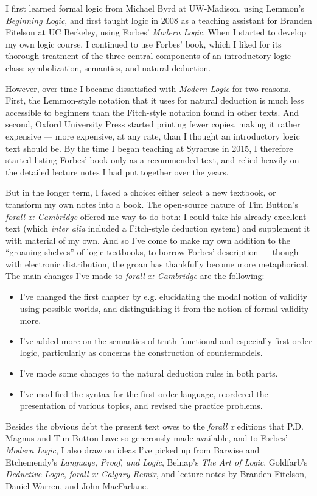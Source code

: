I first learned formal logic from Michael Byrd at UW-Madison, using Lemmon's  \emph{Beginning Logic}, and first taught logic in 2008 as a teaching assistant for Branden Fitelson at UC Berkeley, using Forbes' \emph{Modern Logic}.  When I started to develop my own logic course, I continued to use Forbes' book, which I liked for its thorough treatment of the three central components of an introductory logic class: symbolization, semantics, and natural deduction.  

However, over time I became dissatisfied with \emph{Modern Logic} for two reasons.  First, the Lemmon-style notation that it uses for natural deduction is much less accessible to beginners than the Fitch-style notation found in other texts.  And second, Oxford University Press started printing fewer copies, making it rather expensive --- more expensive, at any rate, than I thought an introductory logic text should be.  By the time I began teaching at Syracuse in 2015, I therefore started listing Forbes' book only as a recommended text, and relied heavily on the detailed lecture notes I had put together over the years.

But in the longer term, I faced a choice: either select a new textbook, or transform my own notes into a book.  The open-source nature of Tim Button's \emph{forall x: Cambridge} offered me way to do both: I could take his already excellent text (which \emph{inter alia} included a Fitch-style deduction system) and supplement it with material of my own.  And so I've come to make my own addition to the ``groaning shelves'' of logic textbooks, to borrow Forbes' description --- though with electronic distribution, the groan has thankfully become more metaphorical. The main changes I've made to \emph{forall x: Cambridge} are the following:
\begin{itemize}
\item I've changed the first chapter by e.g. elucidating the modal notion of validity using possible worlds, and distinguishing it from the notion of formal validity more.
\item I've added more on the semantics of truth-functional and especially first-order logic, particularly as concerns the construction of countermodels.  
\item I've made some changes to the natural deduction rules in both parts.
\item I've modified the syntax for the first-order language, reordered the presentation of various topics, and revised the practice problems.
\end{itemize}
Besides the obvious debt the present text owes to the \emph{forall x} editions that P.D. Magnus and Tim Button have so generously made available,  and to Forbes' \emph{Modern Logic}, I also draw on ideas I've picked up from Barwise and Etchemendy's \emph{Language, Proof, and Logic}, Belnap's \emph{The Art of Logic}, Goldfarb's \emph{Deductive Logic}, \emph{forall x: Calgary Remix}, and lecture notes by Branden Fitelson,  Daniel Warren, and John MacFarlane.


